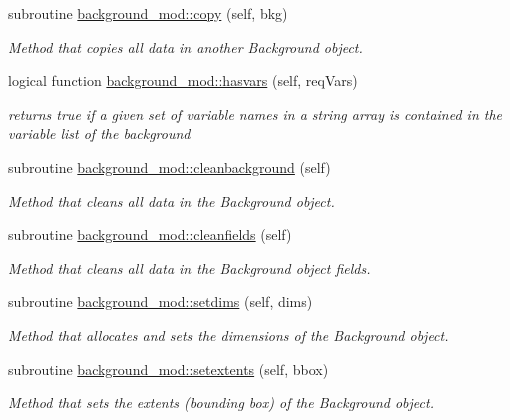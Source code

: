 \begin{DoxyCompactItemize}
subroutine \mbox{\hyperlink{namespacebackground__mod_ac6241a19bbe0f4b2482f95ed3d84056d}{background\+\_\+mod\+::copy}} (self, bkg)
\begin{DoxyCompactList}\small\item\em Method that copies all data in another Background object. \end{DoxyCompactList}\item 
logical function \mbox{\hyperlink{namespacebackground__mod_aaea077e7c8efb080233831f42e90bd9a}{background\+\_\+mod\+::hasvars}} (self, req\+Vars)
\begin{DoxyCompactList}\small\item\em returns true if a given set of variable names in a string array is contained in the variable list of the background \end{DoxyCompactList}\item 
subroutine \mbox{\hyperlink{namespacebackground__mod_a1610fcc9ce260beb3c35418e92a63391}{background\+\_\+mod\+::cleanbackground}} (self)
\begin{DoxyCompactList}\small\item\em Method that cleans all data in the Background object. \end{DoxyCompactList}\item 
subroutine \mbox{\hyperlink{namespacebackground__mod_a843a471a68ce83809e3ed0a40886a4e7}{background\+\_\+mod\+::cleanfields}} (self)
\begin{DoxyCompactList}\small\item\em Method that cleans all data in the Background object fields. \end{DoxyCompactList}\item 
subroutine \mbox{\hyperlink{namespacebackground__mod_a06d96d4627391d74feb105a842a87dc0}{background\+\_\+mod\+::setdims}} (self, dims)
\begin{DoxyCompactList}\small\item\em Method that allocates and sets the dimensions of the Background object. \end{DoxyCompactList}\item 
subroutine \mbox{\hyperlink{namespacebackground__mod_ae8871564866fdd657a25f6a5a2256c33}{background\+\_\+mod\+::setextents}} (self, bbox)
\begin{DoxyCompactList}\small\item\em Method that sets the extents (bounding box) of the Background object. \end{DoxyCompactList}\item 

\end{DoxyCompactItemize}
